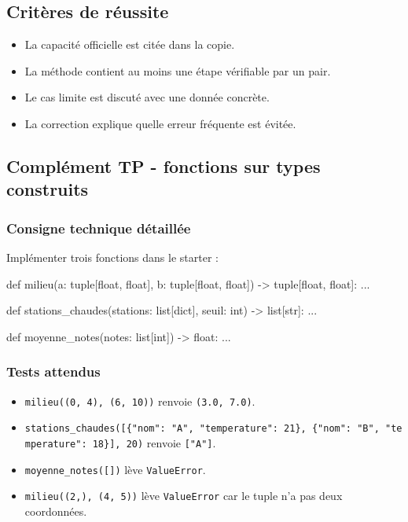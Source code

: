 \subsection{Critères de réussite}

\begin{itemize}
\tightlist
\item
  La capacité officielle est citée dans la copie.
\item
  La méthode contient au moins une étape vérifiable par un pair.
\item
  Le cas limite est discuté avec une donnée concrète.
\item
  La correction explique quelle erreur fréquente est évitée.
\end{itemize}

\subsection{Complément TP - fonctions sur types construits}

\subsubsection{Consigne technique détaillée}

Implémenter trois fonctions dans le starter :

\begin{python}
def milieu(a: tuple[float, float], b: tuple[float, float]) -> tuple[float, float]:
    ...

def stations_chaudes(stations: list[dict], seuil: int) -> list[str]:
    ...

def moyenne_notes(notes: list[int]) -> float:
    ...
\end{python}

\subsubsection{Tests attendus}

\begin{itemize}
\tightlist
\item
  \texttt{milieu((0,\ 4),\ (6,\ 10))} renvoie \texttt{(3.0,\ 7.0)}.
\item
  \texttt{stations\_chaudes({[}\{"nom":\ "A",\ "temperature":\ 21\},\ \{"nom":\ "B",\ "temperature":\ 18\}{]},\ 20)}
  renvoie \texttt{{[}"A"{]}}.
\item
  \texttt{moyenne\_notes({[}{]})} lève \texttt{ValueError}.
\item
  \texttt{milieu((2,),\ (4,\ 5))} lève \texttt{ValueError} car le tuple
  n'a pas deux coordonnées.
\end{itemize}

